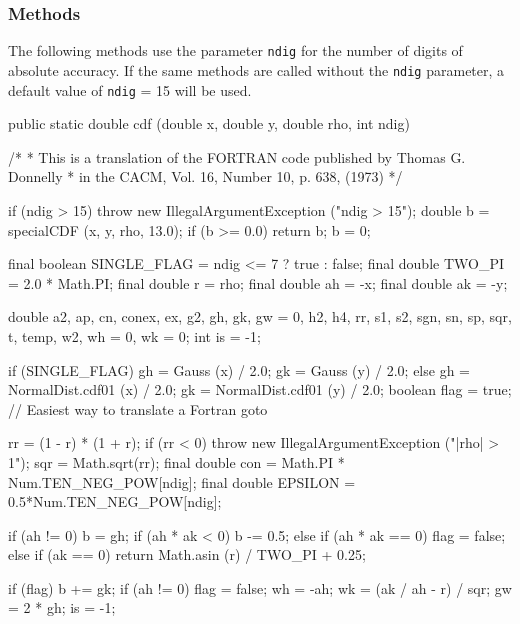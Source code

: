 \subsubsection* {Methods}
  The following methods use the parameter \texttt{ndig} for the number of digits of
  absolute accuracy. If the same methods are called without the  \texttt{ndig}
  parameter, a default value of \texttt{ndig} = 15 will be used.

\begin{code}

   public static double cdf (double x, double y, double rho, int ndig) \begin{hide} {
   /* 
    * This is a translation of the FORTRAN code published by Thomas G. Donnelly
    * in the CACM, Vol. 16, Number 10, p. 638, (1973)
    */

      if (ndig > 15)
         throw new IllegalArgumentException ("ndig > 15");
      double b = specialCDF (x, y, rho, 13.0);
      if (b >= 0.0)
         return b;
      b = 0;

      final boolean SINGLE_FLAG = ndig <= 7 ? true : false;
      final double TWO_PI = 2.0 * Math.PI;
      final double r = rho;
      final double ah = -x;
      final double ak = -y;

      double a2, ap, cn, conex, ex, g2, gh, gk, gw = 0, h2, h4, rr, s1, s2,
         sgn, sn, sp, sqr, t, temp, w2, wh = 0, wk = 0;
      int is = -1;

      if (SINGLE_FLAG) {
         gh = Gauss (x) / 2.0;
         gk = Gauss (y) / 2.0;
      } else {
         gh = NormalDist.cdf01 (x) / 2.0;
         gk = NormalDist.cdf01 (y) / 2.0;
      }
      boolean flag = true;    // Easiest way to translate a Fortran goto

      rr = (1 - r) * (1 + r);
      if (rr < 0)
         throw new IllegalArgumentException ("|rho| > 1");
      sqr = Math.sqrt(rr);
      final double con = Math.PI * Num.TEN_NEG_POW[ndig];
      final double EPSILON = 0.5*Num.TEN_NEG_POW[ndig];

      if (ah != 0) {
         b = gh;
         if (ah * ak < 0)
            b -= 0.5;
         else if (ah * ak == 0) {
            flag = false;
         }
      } else if (ak == 0) {
         return Math.asin (r) / TWO_PI + 0.25;
      }

      if (flag)
         b += gk;
      if (ah != 0) {
         flag = false;
         wh = -ah;
         wk = (ak / ah - r) / sqr;
         gw = 2 * gh;
         is = -1;
      }

}
\end{hide}
\end{code}
